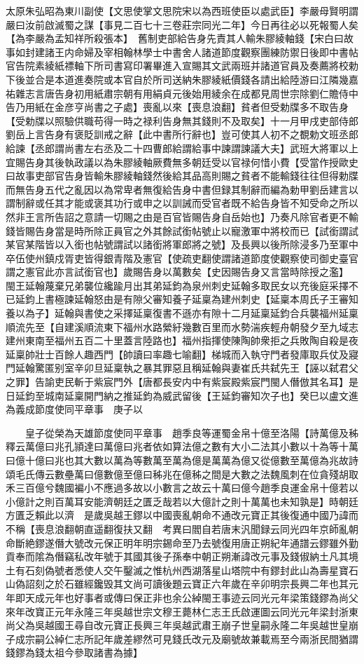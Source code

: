 太原朱弘昭為東川副使【文思使掌文思院宋以為西班使臣以處武臣】李嚴母賢明謂嚴曰汝前啟滅蜀之謀【事見二百七十三卷莊宗同光二年】今日再往必以死報蜀人矣【為李嚴為孟知祥所殺張本】　舊制吏部給告身先責其人輸朱膠綾軸錢【宋白曰故事如封建諸王内命婦及宰相翰林學士中書舍人諸道節度觀察團練防禦日後即中書帖官告院素綾紙褾軸下所司書寫印署畢進入宣賜其文武兩班并諸道官員及奏薦將校勅下後並合是本道進奏院或本官自於所司送納朱膠綾紙價錢各請出給陸游曰江隣幾嘉祐雜志言唐告身初用紙肅宗朝有用絹貞元後始用綾余在成都見周世宗除劉仁贍侍中告乃用紙在金彦亨尚書之子處】喪亂以來【喪息浪翻】貧者但受勅牒多不取告身【受勅牒以照驗供職苟得一時之禄利告身無其錢則不及取矣】十一月甲戌吏部侍郎劉岳上言告身有褒貶訓戒之辭【此中書所行辭也】豈可使其人初不之覩勅文班丞郎給諫【丞郎謂尚書左右丞及二十四曹郎給謂給事中諫謂諫議大夫】武班大將軍以上宜賜告身其後執政議以為朱膠綾軸厥費無多朝廷受以官禄何惜小費【受當作授歐史曰故事吏部官告身皆輸朱膠綾軸錢然後給其品高則賜之貧者不能輸錢往往但得勅牒而無告身五代之亂因以為常卑者無復給告身中書但録其制辭而編為勅甲劉岳建言以謂制辭或任其才能或褒其功行或申之以訓誡而受官者既不給告身皆不知受命之所以然非王言所告詔之意請一切賜之由是百官皆賜告身自岳始也】乃奏凡除官者更不輸錢皆賜告身當是時所除正員官之外其餘試銜帖號止以寵激軍中將校而已【試銜謂試某官某階皆以入銜也帖號謂試以諸銜將軍郎將之號】及長興以後所除浸多乃至軍中卒伍使州鎮戍胥吏皆得銀青階及憲官【使疏吏翻使謂諸道節度使觀察使司御史臺官謂之憲官此亦言試銜官也】歲賜告身以萬數矣【史因賜告身又言當時除授之濫】　閩王延翰蔑棄兄弟襲位纔踰月出其弟延鈞為泉州刺史延翰多取民女以充後庭采擇不已延鈞上書極諫延翰怒由是有隙父審知養子延稟為建州刺史【延稟本周氏子王審知養以為子】延翰與書使之采擇延稟復書不遜亦有隙十二月延稟延鈞合兵襲福州延稟順流先至【自建溪順流東下福州水路縈紆幾數百里而水勢湍疾輕舟朝發夕至九域志建州東南至福州五百二十里蓋言陸路也】福州指揮使陳陶帥衆拒之兵敗陶自殺是夜延稟帥壯士百餘人趣西門【帥讀曰率趣七喻翻】梯城而入執守門者發庫取兵仗及寢門延翰驚匿别室辛卯旦延稟執之暴其罪惡且稱延翰與妻崔氏共弑先王【誣以弑君父之罪】告諭吏民斬于紫宸門外【唐都長安内中有紫宸殿紫宸門閩人僭倣其名耳】是日延鈞至城南延稟開門納之推延鈞為威武留後【王延鈞審知次子也】癸巳以盧文進為義成節度使同平章事　庚子以

　　皇子從榮為天雄節度使同平章事　趙季良等運蜀金帛十億至洛陽【詩萬億及秭釋云萬億曰兆孔頴達曰萬億曰兆者依如算法億之數有大小二法其小數以十為等十萬曰億十億曰兆也其大數以萬為等數萬至萬為億是萬萬為億又從億數至萬億為兆故詩頌毛氏傳云數壘萬曰億數億至億曰秭兆在億秭之間是大數之法魏風刺在位貪殘胡取禾三百億兮魏國褊小不應過多故以小數言之故云十萬曰億今趙季良運金帛十億若以小億計之則百萬耳安能濟朝廷之匱乏哉若以大億計之則十萬萬也未知孰是】時朝廷方匱乏賴此以濟　是歲吳越王鏐以中國喪亂朝命不通改元寶正其後復通中國乃諱而不稱【喪息浪翻朝直遥翻復扶又翻　考異曰閻自若唐末汎聞録云同光四年京師亂朝命斷絶鏐遂僭大號改元保正明年明宗錫命至乃去號復用唐正朔紀年通譜云鏐雖外勤貢奉而隂為僭竊私改年號于其國其後子孫奉中朝正朔漸諱改元事及錢俶納土凡其境土有石刻偽號者悉使人交午鑿滅之惟杭州西湖落星山塔院中有鏐封此山為壽星寶石山偽詔刻之於石雖經鑱毁其文尚可讀後題云寶正六年歲在辛卯明宗長興二年也其元年即天成元年也好事者或傳曰保正非也余公綽閩王事迹云同光元年梁策錢鏐為尚父來年改寶正元年永隆三年吳越世宗文穆王薨林仁志王氏啟運圖云同光元年梁封浙東尚父為吳越國王尋自改元寶正長興三年吳越武肅王崩子世皇嗣永隆二年吳越世皇崩子成宗嗣公綽仁志所記年歲差繆然可見錢氏改元及廟號故兼載焉至今兩浙民間猶謂錢鏐為錢太祖今參取諸書為據】

